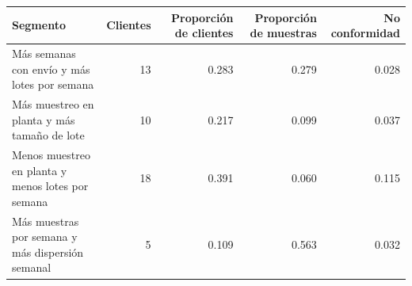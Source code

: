 \begin{tabular}{lrrrr}
\toprule
Segmento & Clientes & Proporción de clientes & Proporción de muestras & No conformidad \\
\midrule
Más semanas con envío y más lotes por semana & 13 & 0.283 & 0.279 & 0.028 \\
Más muestreo en planta y más tamaño de lote & 10 & 0.217 & 0.099 & 0.037 \\
Menos muestreo en planta y menos lotes por semana & 18 & 0.391 & 0.060 & 0.115 \\
Más muestras por semana y más dispersión semanal & 5 & 0.109 & 0.563 & 0.032 \\
\bottomrule
\end{tabular}
